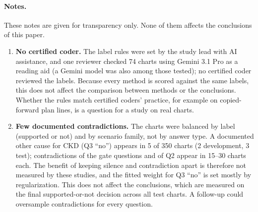 \documentclass[10pt,letterpaper]{article}
\begin{document}
\paragraph{Notes.} These notes are given for transparency only. None of them affects the conclusions of this paper.
\begin{enumerate}[label=\arabic*.,ref=\arabic*]
\item\label{note:coder} \textbf{No certified coder.} The label rules were set by the study lead with AI assistance, and one reviewer checked 74 charts using Gemini 3.1 Pro as a reading aid (a Gemini model was also among those tested); no certified coder reviewed the labels. Because every method is scored against the same labels, this does not affect the comparison between methods or the conclusions. Whether the rules match certified coders' practice, for example on copied-forward plan lines, is a question for a study on real charts.
\item\label{note:contra} \textbf{Few documented contradictions.} The charts were balanced by label (supported or not) and by scenario family, not by answer type. A documented other cause for CKD (Q3 ``no'') appears in 5 of 350 charts (2 development, 3 test); contradictions of the gate questions and of Q2 appear in 15--30 charts each. The benefit of keeping silence and contradiction apart is therefore not measured by these studies, and the fitted weight for Q3 ``no'' is set mostly by regularization. This does not affect the conclusions, which are measured on the final supported-or-not decision across all test charts. A follow-up could oversample contradictions for every question.
\end{enumerate}
\end{document}

